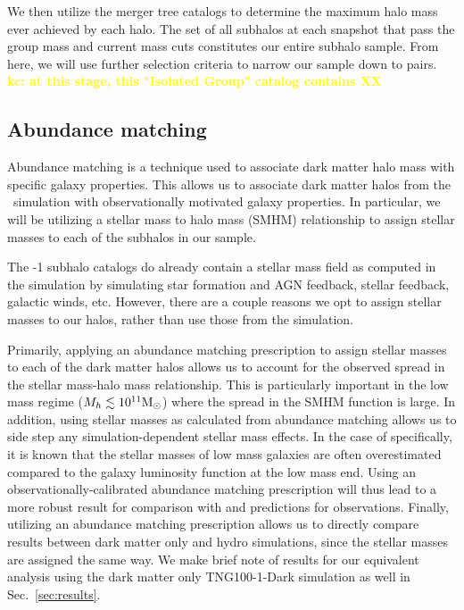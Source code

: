 \documentclass[twocolumn]{aastex631}
\newcommand{\kc}[1]{\textcolor{yellow}{\textbf{kc: #1}} }
\begin{document}
    We then utilize the merger tree catalogs to determine the maximum halo mass ever achieved by each halo. 
    The set of all subhalos at each snapshot that pass the group mass and current mass cuts constitutes our entire subhalo sample. 
    From here, we will use further selection criteria to narrow our sample down to pairs.
    \kc{at this stage, this "Isolated Group" catalog contains XX }


    \subsection{Abundance matching} \label{sec:methods-am}
    Abundance matching is a technique used to associate dark matter halo mass with specific galaxy properties.
    This allows us to associate dark matter halos from the \tng\ simulation with observationally motivated galaxy properties. %
    In particular, we will be utilizing a stellar mass to halo mass (SMHM) relationship to assign stellar masses to each of the subhalos in our sample. 

    The -1 subhalo catalogs do already contain a stellar mass field as computed in the simulation by simulating star formation and  AGN feedback, stellar feedback, galactic winds, etc.    
    However, there are a couple reasons we opt to assign stellar masses to our halos, rather than use those from the simulation. 
    
    Primarily, applying an abundance matching prescription to assign stellar masses to each of the dark matter halos allows us to account for the observed spread in the stellar mass-halo mass relationship. 
    This is particularly important in the low mass regime ($M_h \lesssim 10^{11}\mathrm{M}_\odot$) where the spread in the SMHM function is large. 
    In addition, using stellar masses as calculated from abundance matching allows us to side step any simulation-dependent stellar mass effects.
    In the case of  specifically, it is known that the stellar masses of low mass galaxies are often overestimated compared to the galaxy luminosity function at the low mass end\cite{}. 
    Using an observationally-calibrated abundance matching prescription will thus lead to a more robust result for comparison with and predictions for observations. 
    Finally, utilizing an abundance matching prescription allows us to directly compare results between dark matter only and hydro simulations, since the stellar masses are assigned the same way. 
    We make brief note of results for our equivalent analysis using the dark matter only TNG100-1-Dark simulation as well in Sec.~\ref{sec:results}.
    
\end{document}
